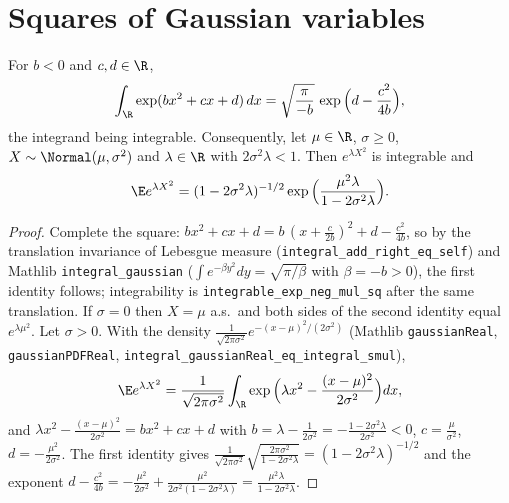 \section{Squares of Gaussian variables}
\label{sec:pre_subexp_gaussian}

\begin{lemma}\label{lem:gaussian_square_mgf}
\leanok
{}
For $b < 0$ and $c, d \in \R$,
\[
  \int_{\R} \exp(bx^2 + cx + d)\,dx = \sqrt{\frac{\pi}{-b}}\,\exp\Big(d - \frac{c^2}{4b}\Big),
\]
the integrand being integrable. Consequently, let $\mu \in \R$, $\sigma \ge 0$,
$X \sim \Normal(\mu,\sigma^2)$ and $\lambda \in \R$ with $2\sigma^2\lambda < 1$. Then
$e^{\lambda X^2}$ is integrable and
\[
  \E e^{\lambda X^2} = (1 - 2\sigma^2\lambda)^{-1/2}\exp\Big(\frac{\mu^2\lambda}{1 - 2\sigma^2\lambda}\Big).
\]
\end{lemma}

\begin{proof}
\leanok
{}
Complete the square: $bx^2 + cx + d = b\,(x + \frac{c}{2b})^2 + d - \frac{c^2}{4b}$, so by the
translation invariance of Lebesgue measure (\texttt{integral\_add\_right\_eq\_self}) and
Mathlib \texttt{integral\_gaussian} ($\int e^{-\beta y^2}dy = \sqrt{\pi/\beta}$ with
$\beta = -b > 0$), the first identity follows; integrability is
\texttt{integrable\_exp\_neg\_mul\_sq} after the same translation.
If $\sigma = 0$ then $X = \mu$ a.s.\ and both sides of the second identity equal
$e^{\lambda\mu^2}$. Let $\sigma > 0$. With the density
$\frac{1}{\sqrt{2\pi\sigma^2}}e^{-(x-\mu)^2/(2\sigma^2)}$ (Mathlib \texttt{gaussianReal},
\texttt{gaussianPDFReal}, \texttt{integral\_gaussianReal\_eq\_integral\_smul}),
\[
  \E e^{\lambda X^2} = \frac{1}{\sqrt{2\pi\sigma^2}}\int_{\R}\exp\Big(\lambda x^2 - \frac{(x-\mu)^2}{2\sigma^2}\Big)dx ,
\]
and $\lambda x^2 - \frac{(x-\mu)^2}{2\sigma^2} = bx^2 + cx + d$ with
$b = \lambda - \frac{1}{2\sigma^2} = -\frac{1-2\sigma^2\lambda}{2\sigma^2} < 0$,
$c = \frac{\mu}{\sigma^2}$, $d = -\frac{\mu^2}{2\sigma^2}$. The first identity gives
$\frac{1}{\sqrt{2\pi\sigma^2}}\sqrt{\frac{2\pi\sigma^2}{1-2\sigma^2\lambda}}
= (1-2\sigma^2\lambda)^{-1/2}$ and the exponent
$d - \frac{c^2}{4b} = -\frac{\mu^2}{2\sigma^2} + \frac{\mu^2}{2\sigma^2(1-2\sigma^2\lambda)}
= \frac{\mu^2\lambda}{1-2\sigma^2\lambda}$.
\end{proof}

